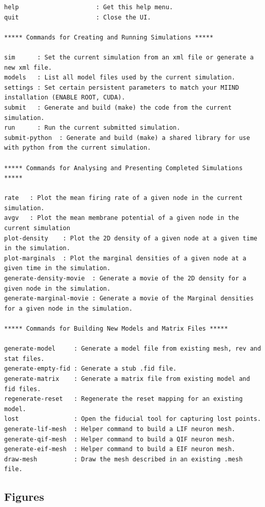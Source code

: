 \documentclass[utf8]{frontiers_suppmat} %
\begin{document}
\begin{lstlisting}
help                     : Get this help menu.
quit                     : Close the UI.

***** Commands for Creating and Running Simulations *****

sim      : Set the current simulation from an xml file or generate a new xml file.
models   : List all model files used by the current simulation.
settings : Set certain persistent parameters to match your MIIND installation (ENABLE ROOT, CUDA).
submit   : Generate and build (make) the code from the current simulation.
run      : Run the current submitted simulation.
submit-python  : Generate and build (make) a shared library for use with python from the current simulation.

***** Commands for Analysing and Presenting Completed Simulations *****

rate   : Plot the mean firing rate of a given node in the current simulation.
avgv   : Plot the mean membrane potential of a given node in the current simulation
plot-density    : Plot the 2D density of a given node at a given time in the simulation.
plot-marginals  : Plot the marginal densities of a given node at a given time in the simulation.
generate-density-movie  : Generate a movie of the 2D density for a given node in the simulation.
generate-marginal-movie : Generate a movie of the Marginal densities for a given node in the simulation.

***** Commands for Building New Models and Matrix Files *****

generate-model     : Generate a model file from existing mesh, rev and stat files.
generate-empty-fid : Generate a stub .fid file.
generate-matrix    : Generate a matrix file from existing model and fid files.
regenerate-reset   : Regenerate the reset mapping for an existing model.
lost               : Open the fiducial tool for capturing lost points.
generate-lif-mesh  : Helper command to build a LIF neuron mesh.
generate-qif-mesh  : Helper command to build a QIF neuron mesh.
generate-eif-mesh  : Helper command to build a EIF neuron mesh.
draw-mesh          : Draw the mesh described in an existing .mesh file.
\end{lstlisting}

\newpage
\subsection{Figures}

\end{document}
